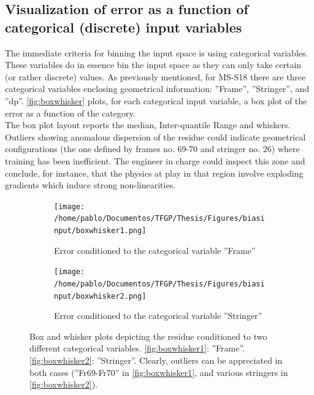 \subsection{Visualization of error as a function of categorical (discrete) input variables}
The immediate criteria for binning the input space is using categorical variables. These variables do in essence bin the input space as they can only take certain (or rather discrete) values. As previously mentioned, for MS-S18 there are three categorical variables enclosing geometrical information: ''Frame'', ''Stringer'', and ''dp''. \autoref{fig:boxwhisker} plots, for each categorical input variable, a box plot of the error as a function of the category.\\
\indent The box plot layout reports the median, Inter-quantile Range and whiskers. Outliers showing anomalous dispersion of the residue could indicate geometrical configurations (\eg the one defined by frames no. 69-70 and stringer no. 26) where training has been inefficient. The engineer in charge could inspect this zone and conclude, for instance, that the physics at play in that region involve exploding gradients which induce strong non-linearities.\\
\begin{figure}
	\centering
	\begin{subfigure}[b]{\textwidth}
		\centering
		\texttt{[image: /home/pablo/Documentos/TFGP/Thesis/Figures/biasinput/boxwhisker1.png]}
		\caption{Error conditioned to the categorical variable ''Frame''}
		\label{fig:boxwhisker1}
	\end{subfigure}
	
	\vspace{1cm} %
	
	\begin{subfigure}[b]{\textwidth}
		\centering
		\texttt{[image: /home/pablo/Documentos/TFGP/Thesis/Figures/biasinput/boxwhisker2.png]}
		\caption{Error conditioned to the categorical variable ''Stringer''}
		\label{fig:boxwhisker2}
	\end{subfigure}
	
	\caption{Box and whisker plots depicting the residue conditioned to two different categorical variables. \autoref{fig:boxwhisker1}: ''Frame''. \autoref{fig:boxwhisker2}: ''Stringer''. Clearly, outliers can be appreciated in both cases (''Fr69-Fr70'' in \autoref{fig:boxwhisker1}, and various stringers in \autoref{fig:boxwhisker2}).}
	\label{fig:boxwhisker}
\end{figure}
%
\FloatBarrier
